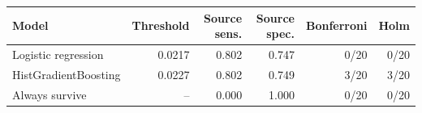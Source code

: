 \begin{tabular}{lrrrrr}
\toprule
Model & Threshold & Source sens. & Source spec. & Bonferroni & Holm \\
\midrule
Logistic regression & 0.0217 & 0.802 & 0.747 & 0/20 & 0/20 \\
HistGradientBoosting & 0.0227 & 0.802 & 0.749 & 3/20 & 3/20 \\
Always survive & -- & 0.000 & 1.000 & 0/20 & 0/20 \\
\bottomrule
\end{tabular}
